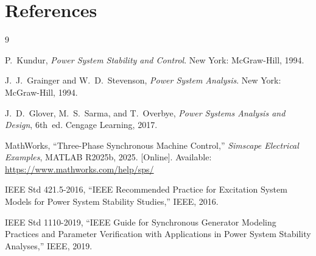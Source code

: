 \section*{References}

\begin{thebibliography}{9}

P.~Kundur,
\textit{Power System Stability and Control}.
New York: McGraw-Hill, 1994.

J.~J.~Grainger and W.~D.~Stevenson,
\textit{Power System Analysis}.
New York: McGraw-Hill, 1994.

J.~D.~Glover, M.~S.~Sarma, and T.~Overbye,
\textit{Power Systems Analysis and Design}, 6th~ed.
Cengage Learning, 2017.

MathWorks,
``Three-Phase Synchronous Machine Control,''
\textit{Simscape Electrical Examples}, MATLAB R2025b, 2025.
[Online]. Available: \url{https://www.mathworks.com/help/sps/}

IEEE Std 421.5-2016,
``IEEE Recommended Practice for Excitation System Models for Power System
Stability Studies,''
IEEE, 2016.

IEEE Std 1110-2019,
``IEEE Guide for Synchronous Generator Modeling Practices and Parameter
Verification with Applications in Power System Stability Analyses,''
IEEE, 2019.

\end{thebibliography}
